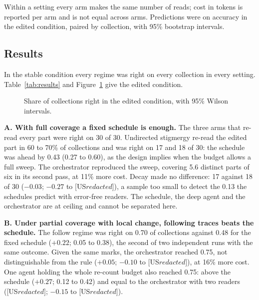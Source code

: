 \documentclass[10pt,twocolumn]{article}
\begin{document}
Within a setting every arm makes the same number of reads; cost in tokens is reported per arm and is not equal across arms. Predictions were on accuracy in the edited condition, paired by collection, with 95\% bootstrap intervals.

\subsection{Results}

In the stable condition every regime was right on every collection in every setting. Table~\ref{tab:results} and Figure~\ref{fig:results} give the edited condition.

\begin{table}[t]
\centering\small

\caption{Collections right in the edited condition, as a count and a share. Dashes are arms that were not run in a setting. Generated from the result files by \texttt{make-figures.mjs}.}
\label{tab:results}
\end{table}

\begin{figure}[t]
\centering

\caption{Share of collections right in the edited condition, with 95\% Wilson intervals.}
\label{fig:results}
\end{figure}

\textbf{A. With full coverage a fixed schedule is enough.} The three arms that re-read every part were right on 30 of 30. Undirected stigmergy re-read the edited part in 60 to 70\% of collections and was right on 17 and 18 of 30: the schedule was ahead by 0.43 (0.27 to 0.60), as the design implies when the budget allows a full sweep. The orchestrator reproduced the sweep, covering 5.6 distinct parts of six in its second pass, at 11\% more cost. Decay made no difference: 17 against 18 of 30 ($-0.03$; $-0.27$ to [US$ redacted]$), a sample too small to detect the 0.13 the schedules predict with error-free readers. The schedule, the deep agent and the orchestrator are at ceiling and cannot be separated here.

\textbf{B. Under partial coverage with local change, following traces beats the schedule.} The follow regime was right on 0.70 of collections against 0.48 for the fixed schedule ($+0.22$; 0.05 to 0.38), the second of two independent runs with the same outcome. Given the same marks, the orchestrator reached 0.75, not distinguishable from the rule ($+0.05$; $-0.10$ to [US$ redacted]$), at 16\% more cost. One agent holding the whole re-count budget also reached 0.75: above the schedule ($+0.27$; 0.12 to 0.42) and equal to the orchestrator with two readers ([US$ redacted]$; $-0.15$ to [US$ redacted]$).
\end{document}
